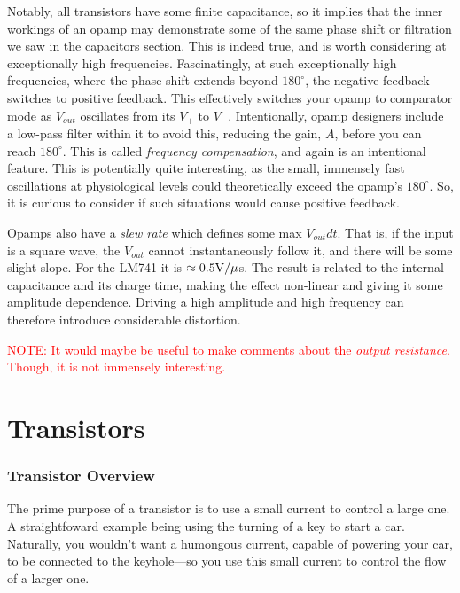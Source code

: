 \documentclass[12pt]{report}
\newcommand{\V}{{\rm V}}
\newcommand{\Vo}{{V}_{out}}
\begin{document}
Notably, all transistors have some finite capacitance, so it implies that the inner workings of an opamp may demonstrate some of the same phase shift or filtration we saw in the capacitors section. This is indeed true, and is worth considering at exceptionally high frequencies. Fascinatingly, at such exceptionally high frequencies, where the phase shift extends beyond $180^{\circ}$, the negative feedback switches to positive feedback. This effectively switches your opamp to comparator mode as $\Vo$ oscillates from its $V_+$ to $V_-$. Intentionally, opamp designers include a low-pass filter within it to avoid this, reducing the gain, $A$, before you can reach $180^{\circ}$. This is called \textit{frequency compensation}, and again is an intentional feature. This is potentially quite interesting, as the small, immensely fast oscillations at physiological levels could theoretically exceed the opamp's $180^{\circ}$. So, it is curious to consider if such situations would cause positive feedback.\newline

Opamps also have a \textit{slew rate} which defines some max $\Vo dt$. That is, if the input is a square wave, the $\Vo$ cannot instantaneously follow it, and there will be some slight slope. For the LM741 it is $\approx 0.5\V / \mu$s. The result is related to the internal capacitance and its charge time, making the effect non-linear and giving it some amplitude dependence. Driving a high amplitude and high frequency can therefore introduce considerable distortion.\newline 

\textcolor{red}{NOTE: It would maybe be useful to make comments about the \textit{output resistance}. Though, it is not immensely interesting.}




\chapter{Transistors}

\subsection{Transistor Overview}

The prime purpose of a transistor is to use a small current to control a large one. A straightfoward example being using the turning of a key to start a car. Naturally, you wouldn't want a humongous current, capable of powering your car, to be connected to the keyhole---so you use this small current to control the flow of a larger one.\newline
\end{document}
